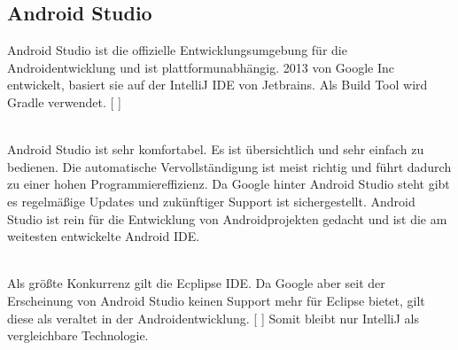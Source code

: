 \documentclass[FIPLY_base.tex]{subfiles}
\begin{document}
\subsection{Android Studio}
Android Studio ist die offizielle Entwicklungsumgebung für die Androidentwicklung und ist plattformunabhängig. 2013 von Google Inc entwickelt, basiert sie auf der IntelliJ IDE von Jetbrains. Als Build Tool wird Gradle verwendet.
[ \cite{androidstudiodef}]  

\ \\
Android Studio ist sehr komfortabel. Es ist übersichtlich und sehr einfach zu bedienen. Die automatische Vervollständigung ist meist richtig und führt dadurch zu einer hohen Programmiereffizienz. Da Google hinter Android Studio steht gibt es regelmäßige Updates und zukünftiger Support ist sichergestellt. 
Android Studio ist rein für die Entwicklung von Androidprojekten gedacht und ist die am weitesten entwickelte Android IDE. 

\ \\Als größte \grqq{}Konkurrenz\grqq{} gilt die Ecplipse IDE. Da Google aber seit der Erscheinung von Android Studio keinen Support mehr für Eclipse bietet, gilt diese als veraltet in der Androidentwicklung.
[ \cite{andrSupp}]  
Somit bleibt nur IntelliJ als vergleichbare Technologie.
\end{document}
